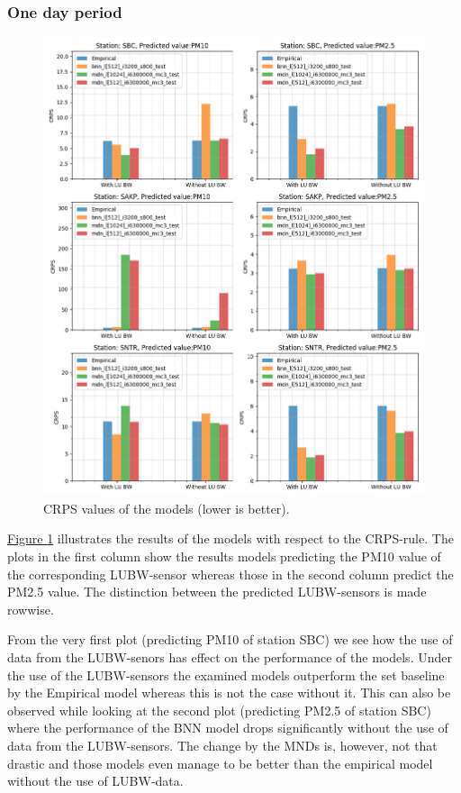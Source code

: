 \documentclass[12pt,a4paper,twoside]{scrartcl}
\numberwithin{equation}{section}
\newcommand{\reffig}[1]{\hyperref[#1]{Figure \ref*{#1}}}
\begin{document}
\subsubsection{One day period}\label{sec:res-1d}
\begin{center}
  \begin{figure}[htbp] \centering \includegraphics[height=1\textwidth,
    width=1\textwidth]{figures/figs_1d/results_plot_CRPS}
    \caption[CRPS results (daily average)]{CRPS values of the models
      (lower is better).}\label{fig:crps-1d}
  \end{figure}
\end{center}
\vspace{-1.3cm}

\reffig{fig:crps-1d} illustrates the results of the models with respect to the CRPS-rule. The plots in the first column show the results models predicting the PM10 value of the corresponding LUBW-sensor whereas those in the second column predict the PM2.5 value. The distinction between the predicted LUBW-sensors is made rowwise.

From the very first plot (predicting PM10 of station SBC) we see how the use of data from the LUBW-senors has effect on the performance of the models. Under the use of the LUBW-sensors the examined models outperform the set baseline by the Empirical model whereas this is not the case without it. This can also be observed while looking at the second plot (predicting PM2.5 of station SBC) where the performance of the BNN model drops significantly without the use of data from the LUBW-sensors. The change by the MNDs is, however, not that drastic and those models even manage to be better than the empirical model without the use of LUBW-data.
\end{document}
